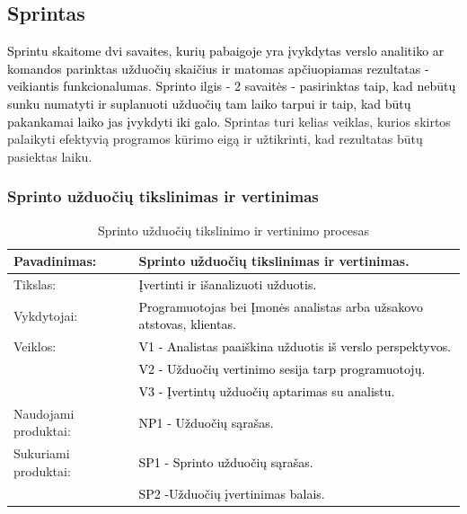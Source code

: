 \documentclass{VUMIFPSkursinis}
\begin{document}
	\subsection{Sprintas}
	\textcolor{black}{Sprintu skaitome dvi savaites, kurių pabaigoje yra įvykdytas verslo analitiko ar komandos parinktas užduočių skaičius ir matomas apčiuopiamas rezultatas - veikiantis funkcionalumas.
	Sprinto ilgis - 2 savaitės - pasirinktas taip, kad nebūtų sunku numatyti ir suplanuoti užduočių tam laiko tarpui ir taip, kad būtų pakankamai laiko jas įvykdyti iki galo.}
	Sprintas turi kelias veiklas, kurios skirtos palaikyti efektyvią programos kūrimo eigą ir užtikrinti, kad rezultatas būtų pasiektas laiku.

	\subsubsection{Sprinto užduočių tikslinimas ir vertinimas}
	\begin{center}
		\begin{table}[ht]
			\caption{Sprinto užduočių tikslinimo ir vertinimo procesas}
			\begin{tabular}{ | l | l | }
				\hline
				Pavadinimas:         & Sprinto užduočių tikslinimas ir vertinimas.				\\ \hline
				Tikslas:             & \textcolor{black}{Įvertinti ir išanalizuoti užduotis.}					\\ \hline
				Vykdytojai:          & \textcolor{black}{Programuotojas bei Įmonės analistas arba užsakovo atstovas, klientas.}	\\ \hline
				Veiklos:             & \textcolor{black}{V1 - Analistas paaiškina užduotis iš verslo perspektyvos. }		\\
				                     & \textcolor{black}{V2 - Užduočių vertinimo sesija tarp programuotojų.	}		\\
				                     & \textcolor{black}{V3 - Įvertintų užduočių aptarimas su analistu. }			\\ \hline
				Naudojami produktai: & \textcolor{black}{NP1 - Užduočių sąrašas. }						\\ \hline
				Sukuriami produktai: & \textcolor{black}{SP1 - Sprinto užduočių sąrašas.} 					\\
				                     & \textcolor{black}{SP2 -Užduočių įvertinimas balais.	}				\\ \hline
			\end{tabular}
		\end{table}
	\end{center}
\end{document}
